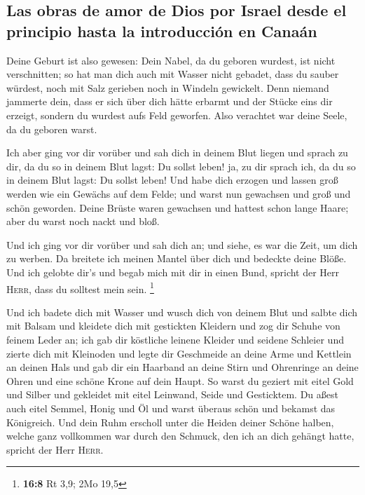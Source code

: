 \hypertarget{las-obras-de-amor-de-dios-por-israel-desde-el-principio-hasta-la-introducciuxf3n-en-canauxe1n}{%
\subsection{Las obras de amor de Dios por Israel desde el principio
hasta la introducción en
Canaán}\label{las-obras-de-amor-de-dios-por-israel-desde-el-principio-hasta-la-introducciuxf3n-en-canauxe1n}}

 Deine Geburt ist also gewesen: Dein Nabel, da du geboren
wurdest, ist nicht verschnitten; so hat man dich auch mit Wasser nicht
gebadet, dass du sauber würdest, noch mit Salz gerieben noch in Windeln
gewickelt.  Denn niemand jammerte dein, dass er sich über
dich hätte erbarmt und der Stücke eins dir erzeigt, sondern du wurdest
aufs Feld geworfen. Also verachtet war deine Seele, da du geboren warst.

 Ich aber ging vor dir vorüber und sah dich in deinem Blut
liegen und sprach zu dir, da du so in deinem Blut lagst: Du sollst
leben! ja, zu dir sprach ich, da du so in deinem Blut lagst: Du sollst
leben!  Und habe dich erzogen und lassen groß werden wie
ein Gewächs auf dem Felde; und warst nun gewachsen und groß und schön
geworden. Deine Brüste waren gewachsen und hattest schon lange Haare;
aber du warst noch nackt und bloß.

 Und ich ging vor dir vorüber und sah dich an; und siehe,
es war die Zeit, um dich zu werben. Da breitete ich meinen Mantel über
dich und bedeckte deine Blöße. Und ich gelobte dir's und begab mich mit
dir in einen Bund, spricht der Herr \textsc{Herr}, dass du solltest mein
sein. \footnote{\textbf{16:8} Rt 3,9; 2Mo 19,5}

 Und ich badete dich mit Wasser und wusch dich von deinem
Blut und salbte dich mit Balsam  und kleidete dich mit
gestickten Kleidern und zog dir Schuhe von feinem Leder an; ich gab dir
köstliche leinene Kleider und seidene Schleier  und
zierte dich mit Kleinoden und legte dir Geschmeide an deine Arme und
Kettlein an deinen Hals  und gab dir ein Haarband an
deine Stirn und Ohrenringe an deine Ohren und eine schöne Krone auf dein
Haupt.  So warst du geziert mit eitel Gold und Silber und
gekleidet mit eitel Leinwand, Seide und Gesticktem. Du aßest auch eitel
Semmel, Honig und Öl und warst überaus schön und bekamst das Königreich.
 Und dein Ruhm erscholl unter die Heiden deiner Schöne
halben, welche ganz vollkommen war durch den Schmuck, den ich an dich
gehängt hatte, spricht der Herr \textsc{Herr}.


